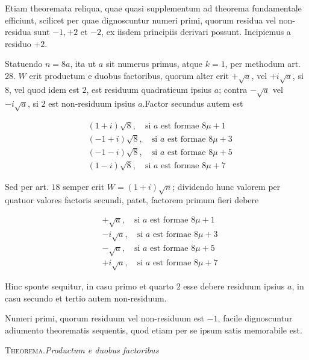 
Etiam theoremata reliqua, quae quasi supplementum ad theorema fundamentale efficiunt, scilicet per quae dignoscuntur numeri primi, quorum residua vel non-residua sunt $-1,+2$ et $-2$, ex iisdem principiis derivari possunt. Incipiemus a residuo $+2$.

Statuendo $n=8a$, ita ut $a$ sit numerus primus, atque $k=1$, per methodum art. $28$. $W$ erit productum e duobus factoribus, quorum alter erit $+\surd a$, vel $+i\surd a$, si $8$, vel quod idem est $2$, est residuum quadraticum ipsius $a$; contra $-\surd a$ vel $-i\surd a$, si $2$ est non-residuum ipsius $a$.\quad Factor secundus autem est

\[
\begin{aligned}
&(1+i)\surd8,\quad\text{si }a\text{ est formae }8\mu+1\\
&(-1+i)\surd8,\quad\text{si }a\text{ est formae }8\mu+3\\
&(-1-i)\surd8,\quad\text{si }a\text{ est formae }8\mu+5\\
&(1-i)\surd8,\quad\text{si }a\text{ est formae }8\mu+7
\end{aligned}
\]

Sed per art. $18$ semper erit $W=(1+i)\surd n$; dividendo hunc valorem per quatuor valores factoris secundi, patet, factorem primum fieri debere

\[
\begin{aligned}
&+\surd a,\quad\text{si }a\text{ est formae }8\mu+1\\
&-i\surd a,\quad\text{si }a\text{ est formae }8\mu+3\\
&-\surd a,\quad\text{si }a\text{ est formae }8\mu+5\\
&+i\surd a,\quad\text{si }a\text{ est formae }8\mu+7
\end{aligned}
\]

Hinc sponte sequitur, in casu primo et quarto $2$ esse debere residuum ipsius $a$, in casu secundo et tertio autem non-residuum.

%

Numeri primi, quorum residuum vel non-residuum est $-1$, facile dignoscuntur adiumento theorematis sequentis, quod etiam per se ipsum satis memorabile est.

\textsc{Theorema.}\quad \textit{Productum e duobus factoribus}

